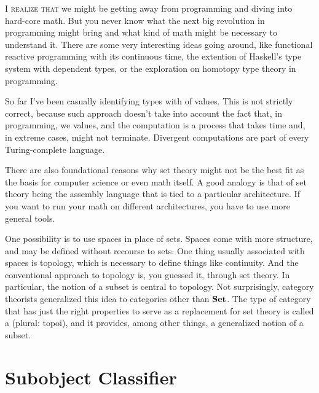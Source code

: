 \lettrine[lhang=0.17]{I}{ realize that} we might be getting away from programming and diving into
hard-core math. But you never know what the next big revolution in
programming might bring and what kind of math might be necessary to
understand it. There are some very interesting ideas going around, like
functional reactive programming with its continuous time, the extention
of Haskell's type system with dependent types, or the exploration on
homotopy type theory in programming.

So far I've been casually identifying types with  of values.
This is not strictly correct, because such approach doesn't take into
account the fact that, in programming, we  values, and the
computation is a process that takes time and, in extreme cases, might
not terminate. Divergent computations are part of every Turing-complete
language.

There are also foundational reasons why set theory might not be the best
fit as the basis for computer science or even math itself. A good
analogy is that of set theory being the assembly language that is tied
to a particular architecture. If you want to run your math on different
architectures, you have to use more general tools.

One possibility is to use spaces in place of sets. Spaces come with more
structure, and may be defined without recourse to sets. One thing
usually associated with spaces is topology, which is necessary to define
things like continuity. And the conventional approach to topology is,
you guessed it, through set theory. In particular, the notion of a
subset is central to topology. Not surprisingly, category theorists
generalized this idea to categories other than $\mathbf{Set}$. The type of
category that has just the right properties to serve as a replacement
for set theory is called a  (plural: topoi), and it
provides, among other things, a generalized notion of a subset.

\section{Subobject Classifier}\label{subobject-classifier}

